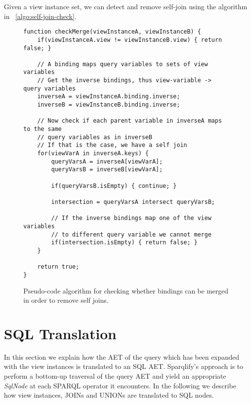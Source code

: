 \documentclass[a4paper,twoside,bibtotoc,abstracton,12pt,BCOR=15mm]{scrreprt}
\begin{document}
Given a view instance set, we can detect and remove self-join using the algorithm in ~\autoref{algo:self-join-check}.

\begin{figure}[!h]
\begin{lstlisting}
function checkMerge(viewInstanceA, viewInstanceB) {
    if(viewInstanceA.view != viewInstanceB.view) { return false; }

	// A binding maps query variables to sets of view variables
	// Get the inverse bindings, thus view-variable -> query variables
	inverseA = viewInstanceA.binding.inverse;
	inverseB = viewInstanceB.binding.inverse;
		
	// Now check if each parent variable in inverseA maps to the same
	// query variables as in inverseB
	// If that is the case, we have a self join
	for(viewVarA in inverseA.keys) {
	    queryVarsA = inverseA[viewVarA];
	    queryVarsB = inverseB[viewVarA];
	    
	    if(queryVarsB.isEmpty) { continue; }
	    
	    intersection = queryVarsA intersect queryVarsB; 
	    
	    // If the inverse bindings map one of the view variables
	    // to different query variable we cannot merge
	    if(intersection.isEmpty) { return false; }
	}
	
	return true;
}
\end{lstlisting}
\caption{Pseudo-code algorithm for checking whether bindings can be merged in order to remove self joins.}
\label{algo:self-join-check}
\end{figure}




\section{SQL Translation}
In this section we explain how the AET of the query which has been expanded with the view instances is translated to an SQL AET.
Sparqlify's approach is to perform a bottom-up traversal of the query AET and yield an appropriate \emph{SqlNode} at each SPARQL operator it encounters.
In the following we describe how view instances, JOINs and UNIONs are translated to SQL nodes.
\end{document}
